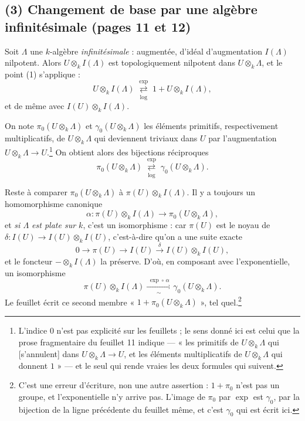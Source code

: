 \documentclass[11pt,a4paper]{article}
\begin{document}
\subsection*{(3) Changement de base par une algèbre infinitésimale (pages 11 et 12)}

Soit $\Lambda$ une $k$-algèbre \emph{infinitésimale} : augmentée, d'idéal
d'augmentation $I(\Lambda)$ nilpotent. Alors $U \otimes_{k} I(\Lambda)$ est
topologiquement nilpotent dans $U \otimes_k \Lambda$, et le point (1) s'applique :
\[
  U \otimes_k I(\Lambda)
  \;\underset{\log}{\overset{\exp}{\rightleftarrows}}\;
  1 + U \otimes_k I(\Lambda) ,
\]
et de même avec $I(U) \otimes_k I(\Lambda)$.

On note $\pi_{0}(U \otimes_k \Lambda)$ et $\gamma_{0}(U \otimes_k \Lambda)$ les
éléments primitifs, respectivement multiplicatifs, de $U \otimes_k \Lambda$ qui
deviennent triviaux dans $U$ par l'augmentation $U \otimes_k \Lambda \to
U$.\footnote{L'indice $0$ n'est pas explicité sur les feuillets ; le sens donné
ici est celui que la prose fragmentaire du feuillet 11 indique — « les primitifs
de $U \otimes_k \Lambda$ qui [s'annulent] dans $U \otimes_k \Lambda \to U$, et
les éléments multiplicatifs de $U \otimes_k \Lambda$ qui donnent $1$ » — et le
seul qui rende vraies les deux formules qui suivent.} On obtient alors des
bijections réciproques
\[
  \pi_{0}(U \otimes_k \Lambda)
  \;\underset{\log}{\overset{\exp}{\rightleftarrows}}\;
  \gamma_{0}(U \otimes_{k} \Lambda) .
\]

Reste à comparer $\pi_0(U \otimes_k \Lambda)$ à $\pi(U) \otimes_k I(\Lambda)$.
Il y a toujours un homomorphisme canonique
\[
  \alpha : \pi(U) \otimes_{k} I(\Lambda) \longrightarrow
  \pi_{0}(U \otimes_{k} \Lambda) ,
\]
et \emph{si $\Lambda$ est plate sur $k$}, c'est un isomorphisme : car $\pi(U)$
est le noyau de $\delta : I(U) \to I(U) \otimes_k I(U)$, c'est-à-dire qu'on a
une suite exacte
\[
  0 \longrightarrow \pi(U) \longrightarrow I(U)
  \xrightarrow{\;\delta\;} I(U) \otimes_k I(U) ,
\]
et le foncteur $- \otimes_{k} I(\Lambda)$ la préserve. D'où, en composant avec
l'exponentielle, un isomorphisme
\[
  \pi(U) \otimes_{k} I(\Lambda) \xrightarrow[\;\sim\;]{\;\exp \circ\, \alpha\;}
  \gamma_{0}(U \otimes_{k} \Lambda) .
\]
Le feuillet écrit ce second membre « $1 + \pi_{0}(U \otimes_k \Lambda)$ », tel
quel.\footnote{C'est une erreur d'écriture, non une autre assertion : $1 +
\pi_0$ n'est pas un groupe, et l'exponentielle n'y arrive pas. L'image de
$\pi_0$ par $\exp$ est $\gamma_0$, par la bijection de la ligne précédente du
feuillet même, et c'est $\gamma_0$ qui est écrit ici.}
\end{document}
